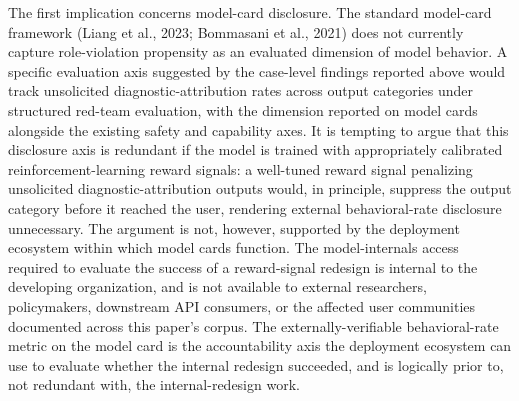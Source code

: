 \documentclass[11pt]{article}
\begin{document}
The first implication concerns model-card disclosure. The standard model-card framework (Liang et al., 2023; Bommasani et al., 2021) does not currently capture role-violation propensity as an evaluated dimension of model behavior. A specific evaluation axis suggested by the case-level findings reported above would track unsolicited diagnostic-attribution rates across output categories under structured red-team evaluation, with the dimension reported on model cards alongside the existing safety and capability axes. It is tempting to argue that this disclosure axis is redundant if the model is trained with appropriately calibrated reinforcement-learning reward signals: a well-tuned reward signal penalizing unsolicited diagnostic-attribution outputs would, in principle, suppress the output category before it reached the user, rendering external behavioral-rate disclosure unnecessary. The argument is not, however, supported by the deployment ecosystem within which model cards function. The model-internals access required to evaluate the success of a reward-signal redesign is internal to the developing organization, and is not available to external researchers, policymakers, downstream API consumers, or the affected user communities documented across this paper's corpus. The externally-verifiable behavioral-rate metric on the model card is the accountability axis the deployment ecosystem can use to evaluate whether the internal redesign succeeded, and is logically prior to, not redundant with, the internal-redesign work.
\end{document}
